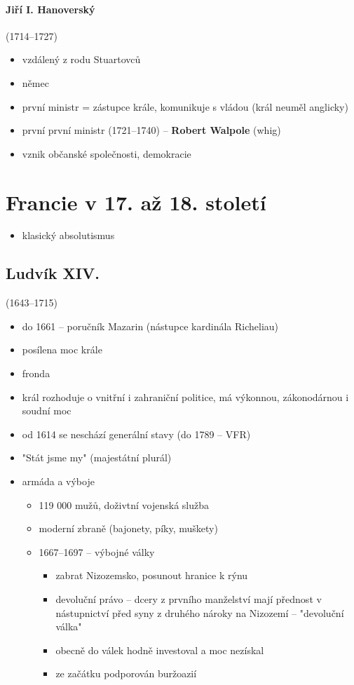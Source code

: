 \paragraph{Jiří I. Hanoverský}(1714--1727)
\begin{itemize}
\item vzdálený z rodu Stuartovců
\item němec 
\item první ministr = zástupce krále, komunikuje s vládou (král neuměl anglicky)
\item první první ministr (1721--1740) -- \textbf{Robert Walpole} (whig) 
\item vznik občanské společnosti, demokracie
\end{itemize}



\section{Francie v 17. až 18. století}
\begin{itemize}
\item klasický absolutismus
\end{itemize}
\subsection{Ludvík XIV.}(1643--1715)
\begin{itemize}
\item do 1661 -- poručník Mazarin (nástupce kardinála Richeliau)
\item posílena moc krále 
\item fronda
\item král rozhoduje o vnitřní i zahraniční politice, má výkonnou, zákonodárnou i soudní moc
\item od 1614 se neschází generální stavy (do 1789 -- VFR)
\item "Stát jsme my" (majestátní plurál)
\item armáda a výboje
	\begin{itemize}
	\item 119 000 mužů, doživtní vojenská služba
	\item moderní zbraně (bajonety, píky, muškety)
	\item 1667--1697 -- výbojné války
		\begin{itemize}
		\item zabrat Nizozemsko, posunout hranice k rýnu
		\item devoluční právo -- dcery z prvního manželství mají přednost v nástupnictví před syny z druhého \ra nároky na Nizozemí -- "devoluční válka"
		\item obecně do válek hodně investoval a moc nezískal
		\item ze začátku podporován buržoazií
		\end{itemize}
	\end{itemize}
\end{itemize}

